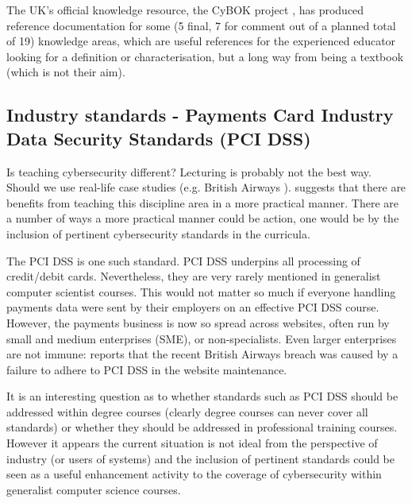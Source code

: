 \documentclass[conference]{IEEEtran}
\begin{document}
The UK's official knowledge resource, the CyBOK project \cite{Bristol2019a}, has produced reference documentation for some (5  final, 7 for comment out of a planned total of 19)   %
knowledge areas, which are useful references for the experienced educator looking for a definition or characterisation, but a long way from being a textbook (which is not their aim).


\subsection{Industry standards - Payments Card Industry Data Security Standards (PCI DSS)}\label{sec:PCIDSS}
Is teaching cybersecurity different? Lecturing is probably not the best way. Should we use real-life case studies (e.g. British Airways \cite{Barth2018a}). \cite{Weiss:2013:THC:2527148.2527180} suggests that there are benefits from teaching this discipline area in a more practical manner.  There are a number of ways a more practical manner could be action, one would be by the inclusion of pertinent cybersecurity standards in the curricula.

The PCI DSS \cite{PCI2018b} is one such standard. PCI DSS underpins all processing of credit/debit cards. Nevertheless, they are very rarely mentioned in generalist computer scientist courses. This would not matter so much if everyone handling payments data were sent by their employers on an effective PCI DSS course. However, the payments business is now so spread across websites, often run by small and medium enterprises (SME), or non-specialists.  Even larger enterprises are not immune: \cite{Barth2018a} reports that the recent British Airways breach was caused by a failure to adhere to PCI DSS in the website maintenance. 

It is an interesting question as to whether standards such as PCI DSS should be addressed within degree courses (clearly degree courses can never cover all standards) or whether they should be addressed in professional training courses. However it appears the current situation is not ideal from the perspective of industry (or users of systems) and the inclusion of pertinent standards could be seen as a useful enhancement activity to the coverage of cybersecurity within generalist %
computer science courses.
\end{document}
